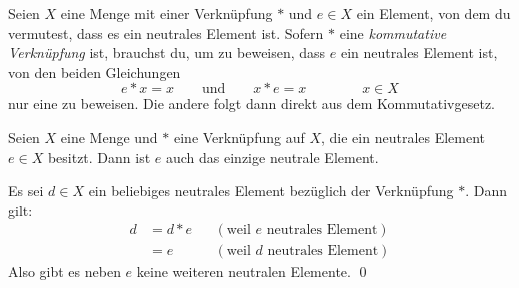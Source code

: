 \begin{bem}
Seien $X$ eine Menge mit einer Verknüpfung $*$ und $e\in X$ ein Element, von dem du vermutest, dass es ein neutrales Element ist. Sofern $*$ eine \emph{kommutative Verknüpfung} ist, brauchst du, um zu beweisen, dass $e$ ein neutrales Element ist, von den beiden Gleichungen
\[ e*x=x \qquad\text{und}\qquad x*e=x \qquad\qquad x\in X \]
nur eine zu beweisen. Die andere folgt dann direkt aus dem Kommutativgesetz.
\end{bem}



\begin{comment}
\begin{bsp}[* Neutrales Element bei $\min$ und $\max$]
 Sei $X$ eine totalgeordnete Menge. Dass ein Element $m\in X$ neutral bezüglich der $\max$-Verknüpfung aus \cref{minmax} ist, hieße, dass für jedes $x\in X$ gelten muss
 \[ \max \{m,x\} = x \]
 was wiederum äquivalent zu $m\leq x$ ist. Also ist ein Element genau dann neutral bezüglich $\max$, wenn es das kleinste Element von $X$ ist (sofern eines existiert). Beispielsweise wäre $0$ neutral bezüglich der $\max$-Verknüpfung auf $\Nz_0$ -- dagegen gäbe es bezüglich der $\max$-Verknüpfung auf $\Zz$ kein neutrales Element. \\
 Analog ist ein Element genau dann neutral bezüglich der $\max$-Verknüpfung, wenn es das größte Element von $X$ ist.
\end{bsp}
\end{comment}




\begin{sat} \label{neutreind}
Seien $X$ eine Menge und $*$ eine Verknüpfung auf $X$, die ein neutrales Element $e\in X$ besitzt. Dann ist $e$ auch das einzige neutrale Element.
\end{sat}
\begin{bew}
Es sei $d\in X$ ein beliebiges neutrales Element bezüglich der Verknüpfung $*$. Dann gilt:
\begin{align*}
 d & = d*e && (\text{weil $e$ neutrales Element}) \\
 & = e && (\text{weil $d$ neutrales Element})
\end{align*}
Also gibt es neben $e$ keine weiteren neutralen Elemente. \qed
\end{bew}




